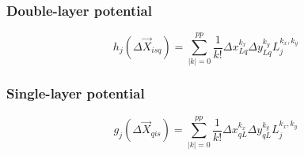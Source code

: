 \documentclass[letter,10pt]{article}
\begin{document}
\subsubsection{Double-layer potential}

\begin{equation}
h_j(\Delta\vec{X}_{isq}) = \sum^{pp}_{|k|=0}\frac{1}{k!}\Delta x_{Lq}^{k_x}\Delta y_{Lq}^{k_y}L_j^{k_x,k_y}
\end{equation}

\subsubsection{Single-layer potential}

\begin{equation}
g_j(\Delta\vec{X}_{qis}) = \sum^{pp}_{|k|=0}\frac{1}{k!}\Delta x_{qL}^{k_x}\Delta y_{qL}^{k_y}L_j^{k_x,k_y}
\end{equation}
\end{document}
